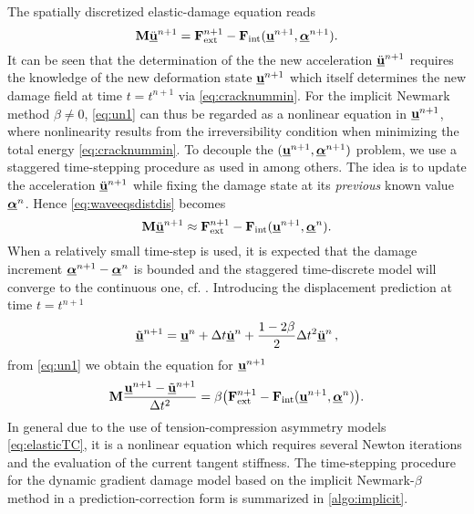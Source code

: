 The spatially discretized elastic-damage equation reads
\begin{equation} \label{eq:waveeqsdistdis}
\vec{M}\ddot{\uvec}^{n+1}=\vec{F}_\mathrm{ext}^{n+1}-\vec{F}_\mathrm{int}(\uvec^{n+1},\dvec^{n+1}).
\end{equation}
It can be seen that the determination of the the new acceleration $\ddot{\uvec}^{n+1}$ requires the knowledge of the new deformation state $\uvec^{n+1}$ which itself determines the new damage field at time $t=t^{n+1}$ via \eqref{eq:cracknummin}. For the implicit Newmark method $\beta\neq 0$, \eqref{eq:un1} can thus be regarded as a nonlinear equation in $\uvec^{n+1}$, where nonlinearity results from the irreversibility condition when minimizing the total energy \eqref{eq:cracknummin}. To decouple the $(\uvec^{n+1},\dvec^{n+1})$ problem, we use a staggered time-stepping procedure as used in \cite{Bourdin:2011,BordenVerhooselScottHughesLandis:2012,HofackerMiehe:2012} among others. The idea is to update the acceleration $\ddot{\uvec}^{n+1}$ while fixing the damage state at its \emph{previous} known value $\dvec^n$. Hence \eqref{eq:waveeqsdistdis} becomes
\begin{equation} \label{eq:waveeqsdistdis2}
\vec{M}\ddot{\uvec}^{n+1}\approx\vec{F}_\mathrm{ext}^{n+1}-\vec{F}_\mathrm{int}(\uvec^{n+1},\dvec^n).
\end{equation}
When a relatively small time-step is used, it is expected that the damage increment $\dvec^{n+1}-\dvec^n$ is bounded and the staggered time-discrete model will converge to the continuous one, cf. \cite{LarsenOrtnerSuli:2010}. Introducing the displacement prediction at time $t=t^{n+1}$
\[
\tilde{\uvec}^{n+1}=\uvec^n+\Delta t\dot{\uvec}^n+\frac{1-2\beta}{2}\Delta t^2\ddot{\uvec}^n\,,
\]
from \eqref{eq:un1} we obtain the equation for $\uvec^{n+1}$
\begin{equation} \label{eq:getuvecnp1}
\vec{M}\frac{\uvec^{n+1}-\tilde{\uvec}^{n+1}}{\Delta t^2}=\beta\bigl(\vec{F}_\mathrm{ext}^{n+1}-\vec{F}_\mathrm{int}(\uvec^{n+1},\dvec^n)\bigr).
\end{equation}
In general due to the use of tension-compression asymmetry models \eqref{eq:elasticTC}, it is a nonlinear equation which requires several Newton iterations and the evaluation of the current tangent stiffness. The time-stepping procedure for the dynamic gradient damage model based on the implicit Newmark-$\beta$ method in a prediction-correction form is summarized in \cref{algo:implicit}.

